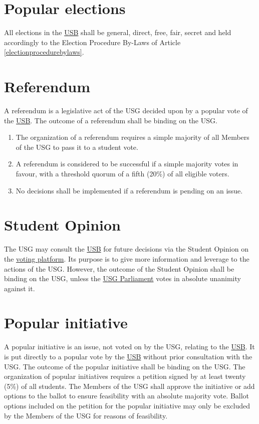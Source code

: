 \documentclass[12pt]{LaTeX_Misc/constitution}
\begin{document}
\section{Popular elections}
All elections in the \hyperref[studentbody]{USB} shall be general, direct, free, fair, secret and held accordingly to the Election Procedure By-Laws of Article \ref{electionprocedurebylaws}.

\section{Referendum}
\label{referendum}
A referendum is a legislative act of the USG decided upon by a popular vote of the \hyperref[studentbody]{USB}. The outcome of a referendum shall be binding on the USG.
\begin{enumerate}[label={\textbf{\S\arabic*}}] 
\item
The organization of a referendum requires a simple majority of all Members of the USG to pass it to a student vote. 
\item
A referendum is considered to be successful if a simple majority votes in favour, with a threshold quorum of a fifth (20\%) of all eligible voters.
\item
No decisions shall be implemented if a referendum is pending on an issue.
\end{enumerate}

\section{Student Opinion}
\label{StudentOpiniondef}
The USG may consult the \hyperref[studentbody]{USB} for future decisions via the Student Opinion on the \href{https://vote.jacobs.university/}{voting platform}. Its purpose is to give more information and leverage to the actions of the USG. However, the outcome of the Student Opinion shall be binding on the USG, unless the \hyperref[USGParliamentDef]{USG Parliament} votes in absolute unanimity against it.

\section{Popular initiative} 
 A popular initiative is an issue, not voted on by the USG, relating to the \hyperref[studentbody]{USB}. It is put directly to a popular vote by the \hyperref[studentbody]{USB} without prior consultation with the USG. The outcome of the popular initiative shall be binding on the USG. The organization of popular initiatives requires a petition signed by at least twenty (5\%)  of all students. The Members of the USG shall approve the initiative or add options to the ballot to ensure feasibility with an absolute majority vote. Ballot options included on the petition for the popular initiative may only be excluded by the Members of the USG for reasons of feasibility.
\end{document}
